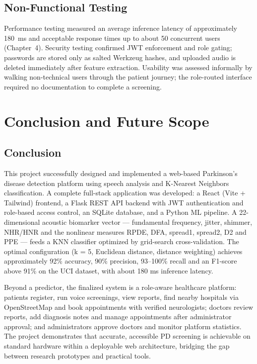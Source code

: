 \documentclass[oneside,a4paper,12pt]{report}
\begin{document}
\section{Non-Functional Testing}
Performance testing measured an average inference latency of approximately 180~ms
and acceptable response times up to about 50 concurrent users (Chapter~4). Security
testing confirmed JWT enforcement and role gating; passwords are stored only as
salted Werkzeug hashes, and uploaded audio is deleted immediately after feature
extraction. Usability was assessed informally by walking non-technical users
through the patient journey; the role-routed interface required no documentation to
complete a screening.

\chapter{Conclusion and Future Scope}

\section{Conclusion}
This project successfully designed and implemented a web-based Parkinson's disease
detection platform using speech analysis and K-Nearest Neighbors classification.
A complete full-stack application was developed: a React (Vite + Tailwind)
frontend, a Flask REST API backend with JWT authentication and role-based access
control, an SQLite database, and a Python ML pipeline. A 22-dimensional acoustic
biomarker vector --- fundamental frequency, jitter, shimmer, NHR/HNR and the
nonlinear measures RPDE, DFA, spread1, spread2, D2 and PPE --- feeds a KNN
classifier optimized by grid-search cross-validation. The optimal configuration
(k = 5, Euclidean distance, distance weighting) achieves approximately 92\%
accuracy, 90\% precision, 93--100\% recall and an F1-score above 91\% on the UCI
dataset, with about 180 ms inference latency.

Beyond a predictor, the finalized system is a role-aware healthcare platform:
patients register, run voice screenings, view reports, find nearby hospitals via
OpenStreetMap and book appointments with verified neurologists; doctors review
reports, add diagnosis notes and manage appointments after administrator
approval; and administrators approve doctors and monitor platform statistics. The
project demonstrates that accurate, accessible PD screening is achievable on
standard hardware within a deployable web architecture, bridging the gap between
research prototypes and practical tools.
\end{document}
